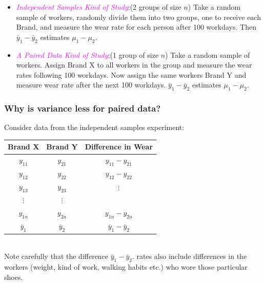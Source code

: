 \documentclass[xcolor=dvipsnames,12pt]{beamer}
\begin{document}
\begin{frame}
\begin{itemize}
\item  \textcolor{magenta}{\textit{Independent Samples Kind of Study}}:(2 groups of size $n$) 
Take a random sample of workers, randomly divide them
into two groups, one to receive each Brand, and measure the wear
rate for  each person after 100 workdays.  Then $\bar{y}_1 - \bar{y}_2$
estimates $\mu_1 - \mu_2$.
\item   \textcolor{magenta}{\textit{A Paired Data Kind of Study}}:(1 group of size $n$) 
Take a random sample of workers. Assign Brand X to 
all workers in the group and measure the wear rates 
following 100 workdays. Now assign the same workers Brand Y
and measure wear rate after the next 100 workdays. $\bar{y}_1 - \bar{y}_2$
estimates $\mu_1 - \mu_2$.
\end{itemize}
\end{frame}




\begin{frame}
\frametitle{Why is variance less for paired data?}
 Consider data from  the independent samples experiment:\\[.1in]
\begin{small}
\begin{tabular}{ccc}
Brand X & Brand Y & Difference in Wear\\ \hline
 $y_{11}$ & $y_{21}$ & $y_{11}-y_{21}$ \\
 $y_{12}$ & $y_{22}$ & $y_{12}-y_{22}$\\
 $y_{13}$ & $y_{23}$ &   $ \vdots $ \\
 $\vdots$ &  $\vdots$ &  \\
$y_{1n}$ &$y_{2n}$ & $y_{1n}-y_{2n}$ \\ \hline
$\bar{y}_1$ & $\bar{y}_2$ & $\bar{y}_1 - \bar{y}_2$ 
\end{tabular}
\end{small}\\[.1in]
 Note carefully that the  difference $\bar{y}_1 - \bar{y}_2$.
rates also include differences in the workers (weight, kind of work,
walking habits etc.) who wore those particular shoes.
\end{frame}
\end{document}
